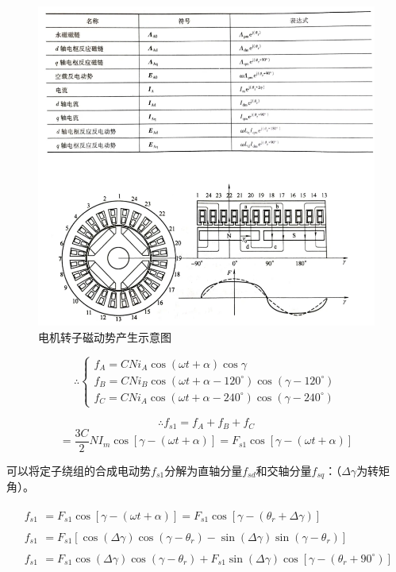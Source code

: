 \documentclass{thuemp}
\begin{document}
\begin{figure}[H]
  \centering
  \includegraphics[width=1\linewidth]{./img/fig32.png}
  \caption{电机转子磁动势产生示意图}
\end{figure}

$$\left.\therefore\left\{\begin{array}{l}f_A=CNi_A\cos(\omega t+\alpha)\cos\gamma\\f_B=CNi_B\cos\left(\omega t+\alpha-120^\circ\right)\cos\left(\gamma-120^\circ\right)\\f_C=CNi_A\cos\left(\omega t+\alpha-240^\circ\right)\cos\left(\gamma-240^\circ\right)\end{array}\right.\right.$$

$$\therefore f_{s1}=f_A+f_B+f_C$$
$$=\frac{3C}{2}NI_m\cos[\gamma-(\omega t+\alpha)]=F_{s1}\cos[\gamma-(\omega t+\alpha)]$$

可以将定子绕组的合成电动势$f_{s1}$分解为直轴分量$f_{sd}$和交轴分量$f_{sq}$：（$\Delta\gamma$为转矩角）。

$$\begin{aligned}
  &f_{s1} \begin{aligned}=F_{s1}\cos[\gamma-(\omega t+\alpha)]=F_{s1}\cos{[\gamma-(\theta_{r}+\Delta\gamma)]}\end{aligned}  \\
  &f_{s1} \begin{aligned}=F_{s1}\left[\cos(\Delta\gamma)\cos{(\gamma-\theta_{r})}-\sin(\Delta\gamma)\sin{(\gamma-\theta_{r})}\right]\end{aligned}  \\
  &f_{s1} \begin{aligned}=F_{s1}\cos(\Delta\gamma)\cos{(\gamma-\theta_{r})}+F_{s1}\sin(\Delta\gamma)\cos{[\gamma-(\theta_{r}+90^{\circ})]}\end{aligned} 
  \end{aligned}$$
\end{document}
